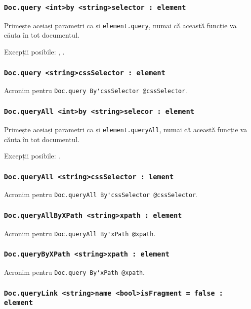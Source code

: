 \subsubsection{\lstinline|Doc.query <int>by <string>selector : element|}

Primește aceiași parametri ca și  \lstinline|element.query|, numai că această funcție va căuta în tot documentul.

Excepții posibile: , .

\subsubsection{\lstinline|Doc.query <string>cssSelector : element|}

Acronim pentru \lstinline|Doc.query By'cssSelector @cssSelector|.

\subsubsection{\lstinline|Doc.queryAll <int>by <string>selecor : element|}

Primește aceiași parametri ca și \lstinline|element.queryAll|, numai că această funcție va căuta în tot documentul.

Excepții posibile: .

\subsubsection{\lstinline|Doc.queryAll <string>cssSelector : lement|}

Acronim pentru \lstinline|Doc.queryAll By'cssSelector @cssSelector|.

\subsubsection{\lstinline|Doc.queryAllByXPath <string>xpath : element|}

Acronim pentru \lstinline|Doc.queryAll By'xPath @xpath|.

\subsubsection{\lstinline|Doc.queryByXPath <string>xpath : element|}

Acronim pentru \lstinline|Doc.query By'xPath @xpath|.

\subsubsection{\lstinline|Doc.queryLink <string>name <bool>isFragment = false : element|}

